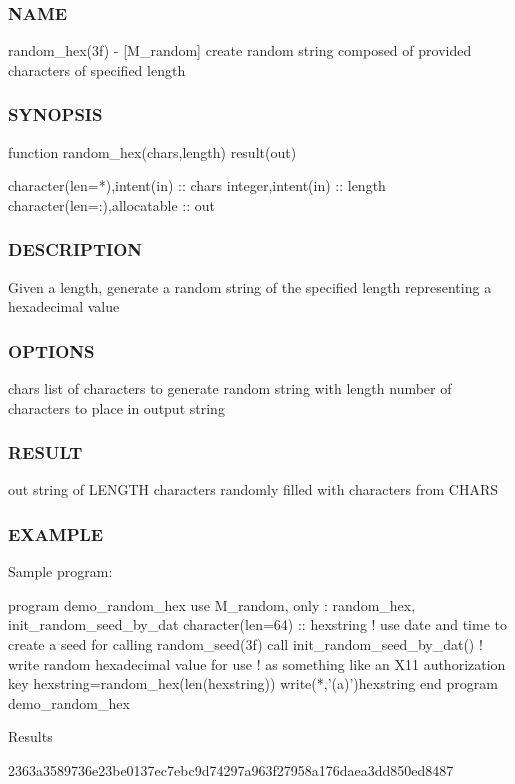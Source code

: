 \subsubsection*{N\+A\+ME}

random\+\_\+hex(3f) -\/ \mbox{[}M\+\_\+random\mbox{]} create random string composed of provided characters of specified length 

\subsubsection*{S\+Y\+N\+O\+P\+S\+IS}

\begin{DoxyVerb}function random_hex(chars,length) result(out)

 character(len=*),intent(in)     :: chars
 integer,intent(in)              :: length
 character(len=:),allocatable    :: out
\end{DoxyVerb}


\subsubsection*{D\+E\+S\+C\+R\+I\+P\+T\+I\+ON}

Given a length, generate a random string of the specified length representing a hexadecimal value

\subsubsection*{O\+P\+T\+I\+O\+NS}

chars list of characters to generate random string with length number of characters to place in output string

\subsubsection*{R\+E\+S\+U\+LT}

out string of L\+E\+N\+G\+TH characters randomly filled with characters from C\+H\+A\+RS

\subsubsection*{E\+X\+A\+M\+P\+LE}

\begin{DoxyVerb}Sample program:

 program demo_random_hex
 use M_random, only : random_hex, init_random_seed_by_dat
    character(len=64) :: hexstring
    ! use date and time to create a seed for calling random_seed(3f)
    call init_random_seed_by_dat()
    ! write random hexadecimal value for use
    ! as something like an X11 authorization key
    hexstring=random_hex(len(hexstring))
    write(*,'(a)')hexstring
 end program demo_random_hex

Results

 2363a3589736e23be0137ec7ebc9d74297a963f27958a176daea3dd850ed8487 \end{DoxyVerb}
 

